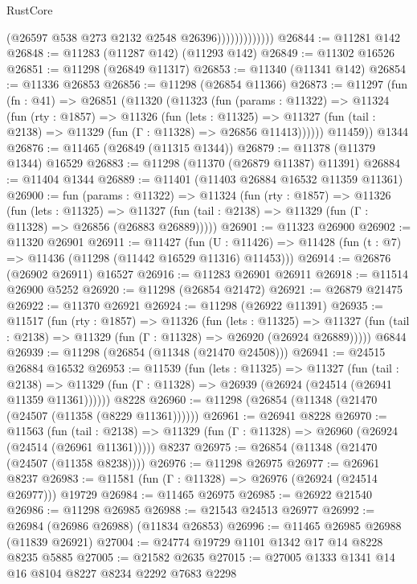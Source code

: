 \begin{lexlean}{RustCore}
\begin{coremodule}
                            (@26597 @538 @273 @2132 @2548 @26396)))))))))))))
@26844 := @11281 @142
@26848 := @11283 (@11287 @142) (@11293 @142)
@26849 := @11302 @16526
@26851 := @11298 (@26849 @11317)
@26853 := @11340 (@11341 @142)
@26854 := @11336 @26853
@26856 := @11298 (@26854 @11366)
@26873 := @11297
    (fun (fn : @41) =>
    @26851
      (@11320
        (@11323
          (fun (params : @11322) =>
          @11324
            (fun (rty : @1857) =>
            @11326
              (fun (lets : @11325) =>
              @11327 (fun (tail : @2138) => @11329 (fun (Γ : @11328) => @26856 @11413))))))
        @11459))
    @1344
@26876 := @11465 (@26849 (@11315 @1344))
@26879 := @11378 (@11379 @1344) @16529
@26883 := @11298 (@11370 (@26879 @11387) @11391)
@26884 := @11404 @1344
@26889 := @11401 (@11403 @26884 @16532 @11359 @11361)
@26900 := fun (params : @11322) =>
  @11324
    (fun (rty : @1857) =>
    @11326
      (fun (lets : @11325) =>
      @11327 (fun (tail : @2138) => @11329 (fun (Γ : @11328) => @26856 (@26883 @26889)))))
@26901 := @11323 @26900
@26902 := @11320 @26901
@26911 := @11427
    (fun (U : @11426) => @11428 (fun (t : @7) => @11436 (@11298 (@11442 @16529 @11316) @11453)))
@26914 := @26876 (@26902 @26911) @16527
@26916 := @11283 @26901 @26911
@26918 := @11514 @26900 @5252
@26920 := @11298 (@26854 @21472)
@26921 := @26879 @21475
@26922 := @11370 @26921
@26924 := @11298 (@26922 @11391)
@26935 := @11517
    (fun (rty : @1857) =>
    @11326
      (fun (lets : @11325) =>
      @11327 (fun (tail : @2138) => @11329 (fun (Γ : @11328) => @26920 (@26924 @26889)))))
    @6844
@26939 := @11298 (@26854 (@11348 (@21470 @24508)))
@26941 := @24515 @26884 @16532
@26953 := @11539
    (fun (lets : @11325) =>
    @11327
      (fun (tail : @2138) =>
      @11329 (fun (Γ : @11328) => @26939 (@26924 (@24514 (@26941 @11359 @11361))))))
    @8228
@26960 := @11298 (@26854 (@11348 (@21470 (@24507 (@11358 (@8229 @11361))))))
@26961 := @26941 @8228
@26970 := @11563
    (fun (tail : @2138) => @11329 (fun (Γ : @11328) => @26960 (@26924 (@24514 (@26961 @11361)))))
    @8237
@26975 := @26854 (@11348 (@21470 (@24507 (@11358 @8238))))
@26976 := @11298 @26975
@26977 := @26961 @8237
@26983 := @11581 (fun (Γ : @11328) => @26976 (@26924 (@24514 @26977))) @19729
@26984 := @11465 @26975
@26985 := @26922 @21540
@26986 := @11298 @26985
@26988 := @21543 @24513 @26977
@26992 := @26984 (@26986 @26988) (@11834 @26853)
@26996 := @11465 @26985 @26988 (@11839 @26921)
@27004 := @24774 @19729 @1101 @1342 @17 @14 @8228 @8235 @5885
@27005 := @21582 @2635
@27015 := @27005 @1333 @1341 @14 @16 @8104 @8227 @8234 @2292 @7683 @2298

\end{coremodule}
\end{lexlean}
